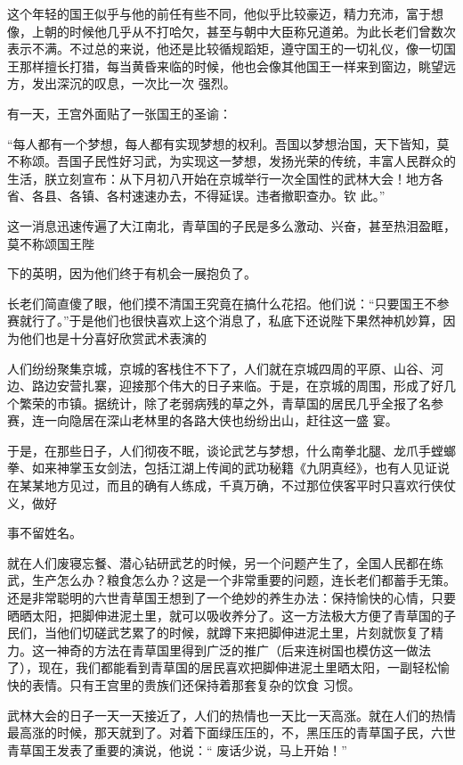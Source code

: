 \documentclass{article}
\begin{document}
\newpage

这个年轻的国王似乎与他的前任有些不同，他似乎比较豪迈，精力充沛，富于想像，上朝的时候他几乎从不打哈欠，甚至与朝中大臣称兄道弟。为此长老们曾数次表示不满。不过总的来说，他还是比较循规蹈矩，遵守国王的一切礼仪，像一切国王那样擅长打猎，每当黄昏来临的时候，他也会像其他国王一样来到窗边，眺望远方，发出深沉的叹息，一次比一次
强烈。 


有一天，王宫外面贴了一张国王的圣谕： 

“每人都有一个梦想，每人都有实现梦想的权利。吾国以梦想治国，天下皆知，莫不称颂。吾国子民性好习武，为实现这一梦想，发扬光荣的传统，丰富人民群众的生活，朕立刻宣布：从下月初八开始在京城举行一次全国性的武林大会！地方各省、各县、各镇、各村速速办去，不得延误。违者撤职查办。钦
此。” 

这一消息迅速传遍了大江南北，青草国的子民是多么激动、兴奋，甚至热泪盈眶，莫不称颂国王陛
\newpage

下的英明，因为他们终于有机会一展抱负了。 

长老们简直傻了眼，他们摸不清国王究竟在搞什么花招。他们说：“只要国王不参赛就行了。”于是他们也很快喜欢上这个消息了，私底下还说陛下果然神机妙算，因为他们也是十分喜好欣赏武术表演的

人们纷纷聚集京城，京城的客栈住不下了，人们就在京城四周的平原、山谷、河边、路边安营扎寨，迎接那个伟大的日子来临。于是，在京城的周围，形成了好几个繁荣的市镇。据统计，除了老弱病残的草之外，青草国的居民几乎全报了名参赛，连一向隐居在深山老林里的各路大侠也纷纷出山，赶往这一盛
宴。 

于是，在那些日子，人们彻夜不眠，谈论武艺与梦想，什么南拳北腿、龙爪手螳螂拳、如来神掌玉女剑法，包括江湖上传闻的武功秘籍《九阴真经》，也有人见证说在某某地方见过，而且的确有人练成，千真万确，不过那位侠客平时只喜欢行侠仗义，做好

\newpage
事不留姓名。 

就在人们废寝忘餐、潜心钻研武艺的时候，另一个问题产生了，全国人民都在练武，生产怎么办？粮食怎么办？这是一个非常重要的问题，连长老们都蓄手无策。还是非常聪明的六世青草国王想到了一个绝妙的养生办法：保持愉快的心情，只要晒晒太阳，把脚伸进泥土里，就可以吸收养分了。这一方法极大方便了青草国的子民们，当他们切磋武艺累了的时候，就蹲下来把脚伸进泥土里，片刻就恢复了精力。这一神奇的方法在青草国里得到广泛的推广（后来连树国也模仿这一做法了），现在，我们都能看到青草国的居民喜欢把脚伸进泥土里晒太阳，一副轻松愉快的表情。只有王宫里的贵族们还保持着那套复杂的饮食
习惯。 

武林大会的日子一天一天接近了，人们的热情也一天比一天高涨。就在人们的热情最高涨的时候，那天就到了。对着下面绿压压的，不，黑压压的青草国子民，六世青草国王发表了重要的演说，他说：“
废话少说，马上开始！” 
\end{document}
